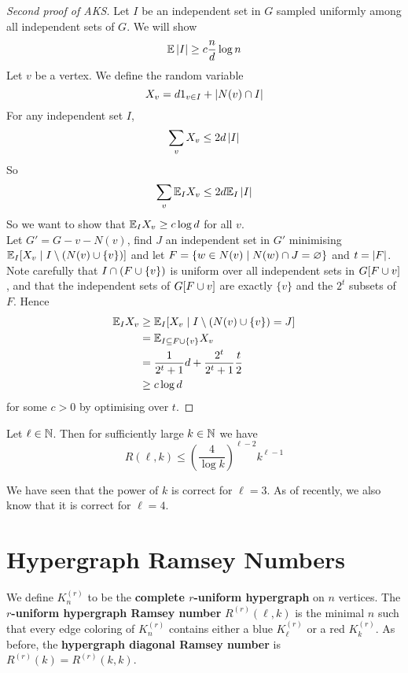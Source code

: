 \documentclass{article}
\begin{document}
\newlec

\begin{proof}[Second proof of AKS]
  Let $I$ be an independent set in $G$ sampled uniformly among all independent sets of $G$. We will show
  $$\mathbb E\left\lvert I\right\rvert \ge c\frac nd\log n$$
  Let $v$ be a vertex. We define the random variable
  $$X_v = d1_{v \in I} + \left\lvert N(v) \cap I\right\rvert$$
  For any independent set $I$,
  $$\sum_v X_v \le 2d\left\lvert I\right\rvert$$
  So
  $$\sum_v \mathbb E_I X_v \le 2d \mathbb E_I \left\lvert I\right\rvert$$
  So we want to show that $\mathbb E_I X_v \ge c \log d$ for all $v$. \\
  Let $G' = G - v - N(v)$, find $J$ an independent set in $G'$ minimising $\mathbb E_I[X_v \mid I \setminus (N(v) \cup \{v\})]$ and let $F = \{w \in N(v) \mid N(w) \cap J = \varnothing\}$ and $t = \left\lvert F\right\rvert$. Note carefully that $I \cap (F \cup \{v\})$ is uniform over all independent sets in $G[F \cup {v}]$, and that the independent sets of $G[F \cup {v}]$ are exactly $\{v\}$ and the $2^t$ subsets of $F$. Hence
  \begin{align*}
    \mathbb E_I X_v
    & \ge \mathbb E_I[X_v \mid I \setminus (N(v) \cup \{v\}) = J] \\
    & = \mathbb E_{I \subseteq F \cup \{v\}} X_v \\
    & = \frac 1{2^t + 1}d + \frac{2^t}{2^t + 1}\frac t2 \\
    & \ge c \log d
  \end{align*}
  for some $c > 0$ by optimising over $t$.
\end{proof}

\begin{thm}
  Let $\ell \in \mathbb N$. Then for sufficiently large $k \in \mathbb N$ we have
  $$R(\ell, k) \le \left(\frac 4{\log k}\right)^{\ell - 2}k^{\ell - 1}$$
\end{thm}

We have seen that the power of $k$ is correct for $\ell = 3$. As of recently, we also know that it is correct for $\ell = 4$.

\clearpage

\section{Hypergraph Ramsey Numbers}

We define $K_n^{(r)}$ to be the {\bf complete $r$-uniform hypergraph} on $n$ vertices. The {\bf $r$-uniform hypergraph Ramsey number} $R^{(r)}(\ell, k)$ is the minimal $n$ such that every edge coloring of $K_n^{(r)}$ contains either a blue $K_\ell^{(r)}$ or a red $K_k^{(r)}$. As before, the {\bf hypergraph diagonal Ramsey number} is $R^{(r)}(k) = R^{(r)}(k, k)$.
\end{document}
